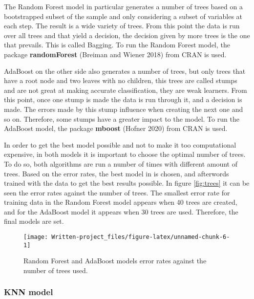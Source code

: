 \documentclass[]{article}
\begin{document}
The Random Forest model in particular generates a number of trees based
on a bootstrapped subset of the sample and only considering a subset of
variables at each step. The result is a wide variety of trees. From this
point the data is run over all trees and that yield a decision, the
decision given by more trees is the one that prevails. This is called
Bagging. To run the Random Forest model, the package
\textbf{randomForest} (Breiman and Wiener 2018) from CRAN is used.

AdaBoost on the other side also generates a number of trees, but only
trees that have a root node and two leaves with no children, this trees
are called stumps and are not great at making accurate classification,
they are weak learners. From this point, once one stump is made the data
is run through it, and a decision is made. The errors made by this stump
influence when creating the next one and so on. Therefore, some stumps
have a greater impact to the model. To run the AdaBoost model, the
package \textbf{mboost} (Hofner 2020) from CRAN is used.

In order to get the best model possible and not to make it too
computational expensive, in both models it is important to choose the
optimal number of trees. To do so, both algorithms are run a number of
times with different amount of trees. Based on the error rates, the best
model in is chosen, and afterwords trained with the data to get the best
results possible. In figure \ref{fig:trees} it can be seen the error
rates against the number of trees. The smallest error rate for training
data in the Random Forest model appears when 40 trees are created, and
for the AdaBoost model it appears when 30 trees are used. Therefore, the
final models are set.

\begin{figure}[!h]

{\centering \texttt{[image: Written-project\_files/figure-latex/unnamed-chunk-6-1]} 

}

\caption{\label{fig:trees} Random Forest and AdaBoost models error rates against the number of trees used.}\label{fig:unnamed-chunk-6}
\end{figure}

\hypertarget{knn-model}{%
\subsubsection{KNN model}\label{knn-model}}
\end{document}
